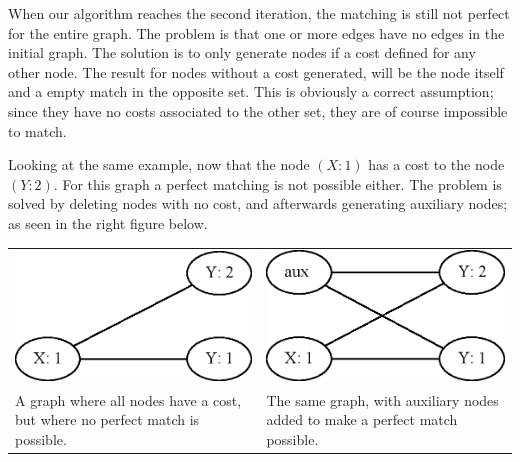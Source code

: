 \documentclass[11pt]{article}
\begin{document}
\endgroup

When our algorithm reaches the second iteration, the matching is still not perfect for the entire graph. The problem is that one or more edges have no edges in the initial graph. The solution is to only generate nodes if a cost defined for any other node. The result for nodes without a cost generated, will be the node itself and a empty match in the opposite set. This is obviously a correct assumption; since they have no costs associated to the other set, they are of course impossible to match.

Looking at the same example, now that the node $(X: 1)$ has a cost to the node $(Y: 2)$. For this graph a perfect matching is not possible either. The problem is solved by deleting nodes with no cost, and afterwards generating auxiliary nodes; as seen in the right figure below. \\

\begingroup
    \fontsize{7pt}{10pt}\selectfont
\begin{tabular}{ p{5.5cm} | p{5.5cm} }
   \centerline{\includegraphics[scale=0.3]{drawings/eps/TwoWayCostMatchingNotPerfect/NoFakeNode.eps}} &
    \centerline{\includegraphics[scale=0.3]{drawings/eps/TwoWayCostMatchingNotPerfect/FakeNode.eps}} \\
   A graph where all nodes have a cost, but where no perfect match is possible. &
    The same graph, with auxiliary nodes added to make a perfect match possible. \\ 
\end{tabular}
\end{document}
